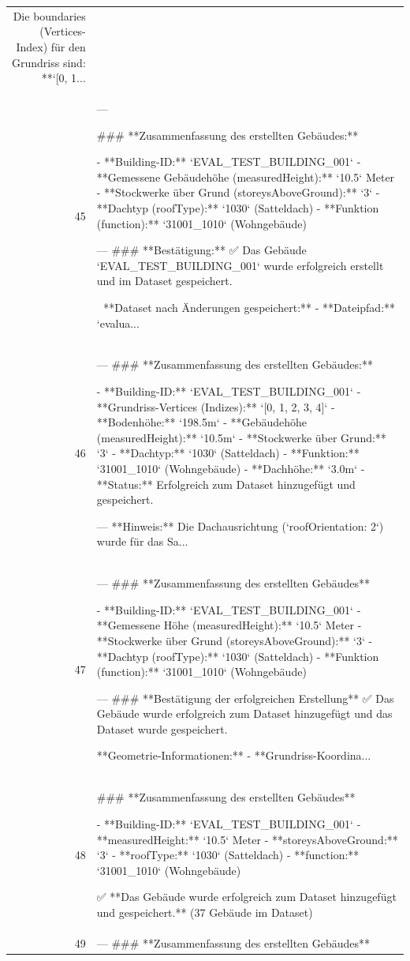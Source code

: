\documentclass[a4paper,11pt]{article}
\begin{document}
\begin{table}[ht]
\begin{tabular}{r p{12cm}}
Die boundaries (Vertices-Index) für den Grundriss sind:
**`[0, 1... \\
45 & ---

\#\#\# **Zusammenfassung des erstellten Gebäudes:**

- **Building-ID:** `EVAL\_TEST\_BUILDING\_001`
- **Gemessene Gebäudehöhe (measuredHeight):** `10.5` Meter
- **Stockwerke über Grund (storeysAboveGround):** `3`
- **Dachtyp (roofType):** `1030` (Satteldach)
- **Funktion (function):** `31001\_1010` (Wohngebäude)

---
\#\#\# **Bestätigung:**
✅ Das Gebäude `EVAL\_TEST\_BUILDING\_001` wurde erfolgreich erstellt und im Dataset gespeichert.

📌 **Dataset nach Änderungen gespeichert:**
- **Dateipfad:** `evalua... \\
46 & ---
\#\#\# **Zusammenfassung des erstellten Gebäudes:**

- **Building-ID:** `EVAL\_TEST\_BUILDING\_001`
- **Grundriss-Vertices (Indizes):** `[0, 1, 2, 3, 4]`
- **Bodenhöhe:** `198.5m`
- **Gebäudehöhe (measuredHeight):** `10.5m`
- **Stockwerke über Grund:** `3`
- **Dachtyp:** `1030` (Satteldach)
- **Funktion:** `31001\_1010` (Wohngebäude)
- **Dachhöhe:** `3.0m`
- **Status:** Erfolgreich zum Dataset hinzugefügt und gespeichert.

---
**Hinweis:** Die Dachausrichtung (`roofOrientation: 2`) wurde für das Sa... \\
47 & ---
\#\#\# **Zusammenfassung des erstellten Gebäudes**

- **Building-ID:** `EVAL\_TEST\_BUILDING\_001`
- **Gemessene Höhe (measuredHeight):** `10.5` Meter
- **Stockwerke über Grund (storeysAboveGround):** `3`
- **Dachtyp (roofType):** `1030` (Satteldach)
- **Funktion (function):** `31001\_1010` (Wohngebäude)

---
\#\#\# **Bestätigung der erfolgreichen Erstellung**
✅ Das Gebäude wurde erfolgreich zum Dataset hinzugefügt und das Dataset wurde gespeichert.

**Geometrie-Informationen:**
- **Grundriss-Koordina... \\
48 & \#\#\# **Zusammenfassung des erstellten Gebäudes**

- **Building-ID:** `EVAL\_TEST\_BUILDING\_001`
- **measuredHeight:** `10.5` Meter
- **storeysAboveGround:** `3`
- **roofType:** `1030` (Satteldach)
- **function:** `31001\_1010` (Wohngebäude)

✅ **Das Gebäude wurde erfolgreich zum Dataset hinzugefügt und gespeichert.** (37 Gebäude im Dataset) \\
49 & ---
\#\#\# **Zusammenfassung des erstellten Gebäudes**


\end{tabular}
\end{table}
\end{document}
